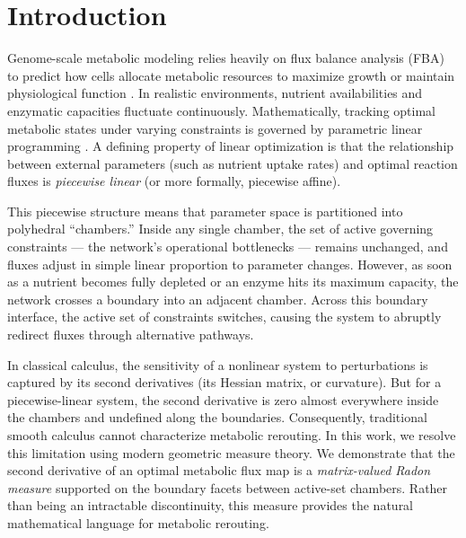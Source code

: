 \documentclass[11pt,a4paper]{article}
\theoremstyle{plain}
\theoremstyle{definition}
\theoremstyle{remark}
\begin{document}
\section{Introduction}\label{sec:intro}

Genome-scale metabolic modeling relies heavily on flux balance
analysis (FBA) to predict how cells allocate metabolic resources to
maximize growth or maintain physiological function \citep{varma1994,
orth2010, lewis2010}. In realistic environments, nutrient
availabilities and enzymatic capacities fluctuate continuously.
Mathematically, tracking optimal metabolic states under varying
constraints is governed by parametric linear programming
\citep{borrelli2003}. A defining property of linear optimization is
that the relationship between external parameters (such as nutrient
uptake rates) and optimal reaction fluxes is \emph{piecewise linear}
(or more formally, piecewise affine).

This piecewise structure means that parameter space is partitioned
into polyhedral ``chambers.'' Inside any single chamber, the set of
active governing constraints --- the network's operational
bottlenecks --- remains unchanged, and fluxes adjust in simple linear
proportion to parameter changes. However, as soon as a nutrient
becomes fully depleted or an enzyme hits its maximum capacity, the
network crosses a boundary into an adjacent chamber. Across this
boundary interface, the active set of constraints switches, causing
the system to abruptly redirect fluxes through alternative pathways.

In classical calculus, the sensitivity of a nonlinear system to
perturbations is captured by its second derivatives (its Hessian
matrix, or curvature). But for a piecewise-linear system, the second
derivative is zero almost everywhere inside the chambers and
undefined along the boundaries. Consequently, traditional smooth
calculus cannot characterize metabolic rerouting. In this work, we
resolve this limitation using modern geometric measure theory. We
demonstrate that the second derivative of an optimal metabolic flux
map is a \emph{matrix-valued Radon measure} supported on the boundary
facets between active-set chambers. Rather than being an intractable
discontinuity, this measure provides the natural mathematical
language for metabolic rerouting.
\end{document}
